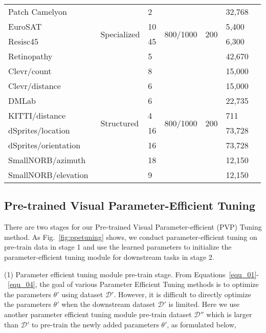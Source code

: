 \documentclass[10pt,journal,letterpaper,compsoc]{IEEEtran}
\begin{document}
\begin{table*}[h]
\begin{center}
{\begin{tabular}{l l  l l l l l}
  \quad Patch Camelyon~\cite{vtab_patch_camelyon} &\multirow{4}{*}{Specialized} &2
  &\multirow{4}{*}{800/1000} &\multirow{4}{*}{200} &32,768
  \\
  \quad EuroSAT~\cite{vtab_eurosat} & &10 && &5,400
  \\
  \quad Resisc45~\cite{vtab_resisc45} & &45 && &6,300
  \\
  \quad Retinopathy~\cite{vtab_retinopathy} & &5 && &42,670
  \\

\cmidrule{2-6}
  \quad Clevr/count~\cite{vtab_clevr} &\multirow{8}{*}{Structured}
  &8
  &\multirow{8}{*}{800/1000} &\multirow{8}{*}{200} &15,000
  \\
  \quad Clevr/distance~\cite{vtab_clevr} & &6 && &15,000
  \\
  \quad DMLab~\cite{vtab_dmlab} & &6 && &22,735
  \\
  \quad KITTI/distance~\cite{vtab_kitti_dist} & &4 && &711
  \\
  \quad dSprites/location~\cite{vtab_dsprites} & &16 && &73,728
  \\
  \quad dSprites/orientation~\cite{vtab_dsprites} & &16 && &73,728
  \\
  \quad SmallNORB/azimuth~\cite{vtab_smallnorb} & &18 && &12,150
  \\
  \quad SmallNORB/elevation~\cite{vtab_smallnorb} & &9 && &12,150
\\

\bottomrule\end{tabular} }\end{center}
\end{table*}
\setlength{\tabcolsep}{1.4pt}

\subsection{Pre-trained Visual Parameter-Efficient Tuning}

There are two stages for our Pre-trained Visual Parameter-efficient (PVP) Tuning method. As Fig.~\ref{fig:ppetuning} shows, we conduct parameter-efficient tuning on pre-train data in stage 1 and use the learned parameters to initialize the parameter-efficient tuning module for downstream tasks in stage 2.

(1) Parameter efficient tuning module pre-train stage. From Equations~\ref{equ_01}-~\ref{equ_04}, the goal of various Parameter Efficient Tuning methods is to optimize the parameters $\theta'$ using dataset $\mathcal{D'}$. However, it is difficult to directly optimize the parameters $\theta'$ when the downstream dataset $\mathcal{D'}$ is limited. Here we use another parameter efficient tuning module pre-train dataset $\mathcal{D''}$ which is larger than $\mathcal{D'}$ to pre-train the newly added parameters $\theta'$, as formulated below,
\end{document}
